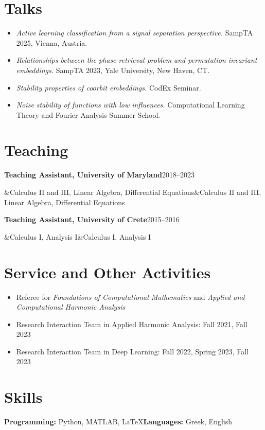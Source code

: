 \documentclass[11pt,letterpaper]{article}
\newcommand{\entry}[3]{%
  \textbf{#1}\hfill{\small #2}\par
  \ifx&#3&\else #3\par\fi
  \vspace{0.8ex}}
\begin{document}
\section{Talks}
\begin{itemize}[leftmargin=3.4em,labelwidth=2.8em,labelsep=0.6em,align=left,itemsep=0.6ex]
  \item[2025] \textit{Active learning classification from a signal separation perspective.}
    SampTA 2025, Vienna, Austria.
  \item[2023] \textit{Relationships between the phase retrieval problem and permutation invariant embeddings.}
    SampTA 2023, Yale University, New Haven, CT.
  \item[2023] \textit{Stability properties of coorbit embeddings.} CodEx Seminar.
  \item[2022] \textit{Noise stability of functions with low influences.}
    Computational Learning Theory and Fourier Analysis Summer School.
\end{itemize}

\section{Teaching}
\entry{Teaching Assistant, University of Maryland}{2018--2023}{Calculus II and III, Linear Algebra, Differential Equations}
\entry{Teaching Assistant, University of Crete}{2015--2016}{Calculus I, Analysis I}

\section{Service and Other Activities}
\begin{itemize}[itemsep=0.3ex]
  \item Referee for \textit{Foundations of Computational Mathematics} and \textit{Applied and Computational Harmonic Analysis}
  \item Research Interaction Team in Applied Harmonic Analysis: Fall 2021, Fall 2023
  \item Research Interaction Team in Deep Learning: Fall 2022, Spring 2023, Fall 2023
\end{itemize}

\section{Skills}
\textbf{Programming:} Python, MATLAB, \LaTeX \qquad \textbf{Languages:} Greek, English
\end{document}
